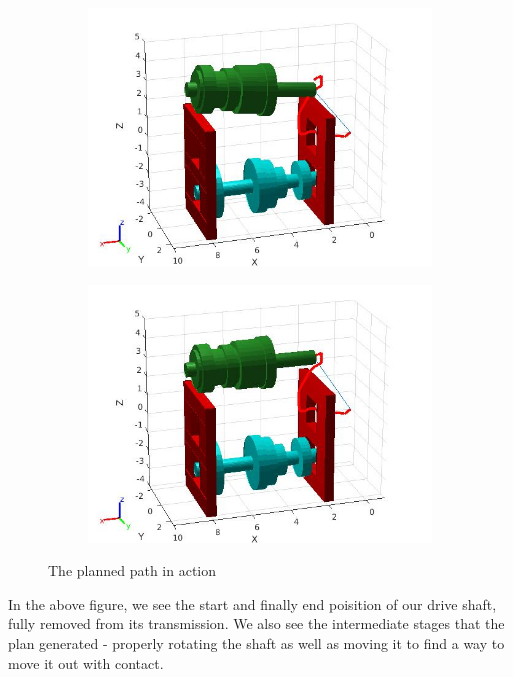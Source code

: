 \documentclass{article}
\begin{document}
\begin{figure}[H]
\begin{subfigure}{0.4\textwidth}
    \end{subfigure}
    \begin{subfigure}{0.4\textwidth}
        \centering
        \includegraphics[width = \textwidth]{img/pose_3.jpg}
    \end{subfigure}
    \begin{subfigure}{0.4\textwidth}
        \centering
        \includegraphics[width = \textwidth]{img/pose_4.jpg}
    \end{subfigure}
    \caption{The planned path in action}
    \label{fig:path-poses}
\end{figure}

In the above figure, we see the start and finally end poisition of our drive shaft, fully removed from its transmission. We also see the intermediate stages that the plan generated - properly rotating the shaft as well as moving it to find a way to move it out with contact.
\end{document}
